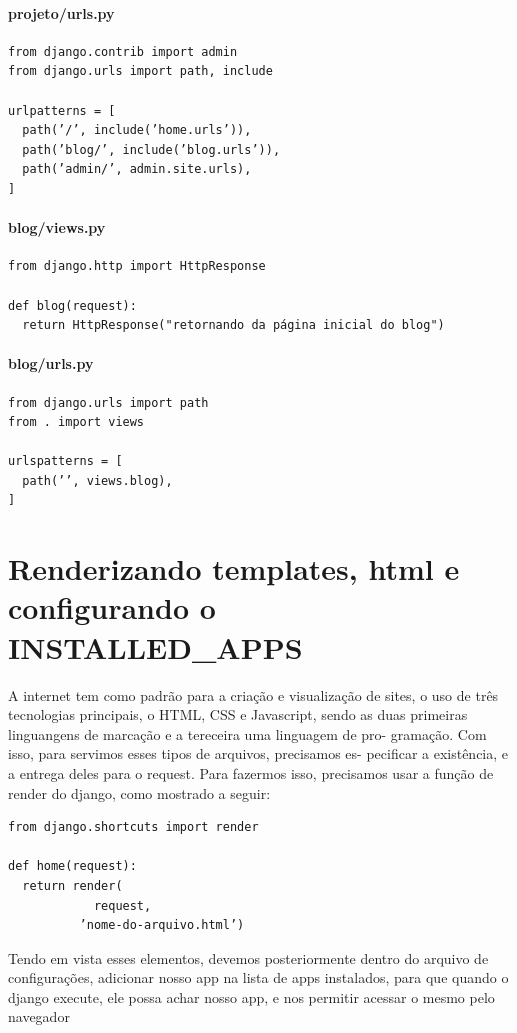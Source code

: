 \documentclass[12pt, a4paper]{paper}
\begin{document}
\paragraph{projeto/urls.py} %
\label{par:projeto/urls.py}
\begin{verbatim}
from django.contrib import admin
from django.urls import path, include

urlpatterns = [
  path(’/’, include(’home.urls’)),
  path(’blog/’, include(’blog.urls’)),
  path(’admin/’, admin.site.urls),
]
\end{verbatim}

\paragraph{blog/views.py} %
\label{par:blog/views.py}

\begin{verbatim}
from django.http import HttpResponse

def blog(request):
  return HttpResponse("retornando da página inicial do blog")
\end{verbatim}

\paragraph{blog/urls.py} %
\label{par:blog/urls.py}
\begin{verbatim}
from django.urls import path
from . import views

urlspatterns = [
  path(’’, views.blog),
]
\end{verbatim}


\section{Renderizando templates, html e configurando o INSTALLED\_APPS} %
\label{sec:Renderizando templates, html e configurando o INSTALLED\_APPS}
A internet tem como padrão para a criação e visualização de sites, o uso
de três tecnologias principais, o HTML, CSS e Javascript, sendo as duas
primeiras linguangens de marcação e a tereceira uma linguagem de pro-
gramação. Com isso, para servimos esses tipos de arquivos, precisamos es-
pecificar a existência, e a entrega deles para o request. Para fazermos isso,
precisamos usar a função de render do django, como mostrado a seguir:

\begin{verbatim}
from django.shortcuts import render

def home(request):
  return render(
            request,
          ’nome-do-arquivo.html’)
\end{verbatim}

Tendo em vista esses elementos, devemos posteriormente dentro do arquivo de 
configurações, adicionar nosso app na lista de apps instalados, para que quando
o django execute, ele possa achar nosso app, e nos permitir acessar o mesmo
pelo navegador
\end{document}
